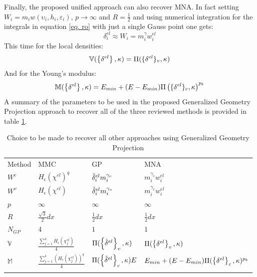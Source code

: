  Finally, the proposed unified approach can also recover MNA. In fact setting $W_i=m_i w(\upsilon_i,h_i,\varepsilon_i)$, $p\to\infty$ and $R=\frac{1}{2}$ and using numerical integration for the integrals in equation \eqref{eq. ro} with just a single Gauss point one gets:
 \begin{equation}
     \delta_i^{el}\approx W_i=m_i^\gamma w_i^{el}
 \end{equation}
 This time for the local densities:
 \begin{equation}
    \mathbb{V}(\left\{{\delta^{el}}\right\},\kappa)=\Pi(\lbrace\mathbf{{\delta}}^{el}\rbrace_v,\kappa) 
 \end{equation}
 And for the Young's modulus:
  \begin{equation}
    \mathbb{M}(\left\{{\delta^{el}}\right\},\kappa)=E_{min}+(E-E_{min})\Pi\left(\lbrace\mathbf{{\delta}}^{el}\rbrace_c,\kappa\right)^{p_b}
 \end{equation}
  A summary of the parameters to be used in the proposed Generalized Geometry Projection approach to recover all of the three reviewed methods is provided in table \ref{tab:1}.\\
\begin{table}[!h]
\caption{Choice to be made to recover all other approaches using Generalized Geometry Projection }
\label{tab:1}       %
\centering
\begin{tabular}{llll}
\hline\noalign{\smallskip}
Method & MMC & GP & MNA \\
\noalign{\smallskip}\hline\noalign{\smallskip}
$W^c$ & $H_{\epsilon}(\chi^{el})^q$ & $\Tilde{\delta}_i^{el} m_i^{\gamma_c}$&  $m_i^{\gamma_c} w^{el}_i$\\
$W^v$ &$H_{\epsilon}(\chi^{el})$  & $\Tilde{\delta}_i^{el} m_i^{\gamma_v}$&  $m_i^{\gamma_v} w^{el}_i$\\
$p$ &  $\infty$&$\infty$&$\infty$\\
$R$ & $\frac{\sqrt{3}}{2}dx$&  $\frac{1}{2}dx$&  $\frac{1}{2}dx$\\
$N_{GP}$ &  $4$&$1$&$1$\\
$\mathbb{V}$ & $\frac{\sum_{j=1}^4 H_{\epsilon}(\chi_j^{el})}{4}$ & $\Pi(\left\{{\hat{\delta}^{el}}\right\}_v,\kappa)$ & $\Pi(\left\{{{\delta}^{el}}\right\}_v,\kappa)$ \\
$\mathbb{M}$ & $\frac{\sum_{j=1}^4 (H_{\epsilon}(\chi_j^{el}))^q}{4}$ & $\Pi(\left\{{\hat{\delta}^{el}}\right\}_c,\kappa)E$ & $E_{min}+(E-E_{min})\Pi(\left\{{{\delta}^{el}}\right\}_c,\kappa)^{p_b}$ \\
\noalign{\smallskip}\hline
\end{tabular}
\end{table}
